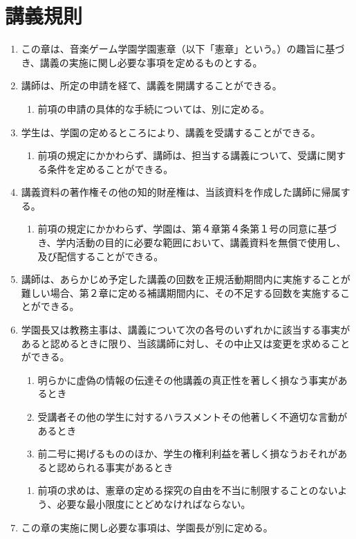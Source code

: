 \newpage
\chapter{講義規則}
\begin{enumerate}[label=第\arabic*条　]
  \item この章は、音楽ゲーム学園学園憲章（以下「憲章」という。）の趣旨に基づき、講義の実施に関し必要な事項を定めるものとする。
  \item 講師は、所定の申請を経て、講義を開講することができる。
    \begin{enumerate}[label=\arabic*　,start=2,leftmargin=*]
      \item 前項の申請の具体的な手続については、別に定める。
    \end{enumerate}
  \item 学生は、学園の定めるところにより、講義を受講することができる。
    \begin{enumerate}[label=\arabic*　,start=2,leftmargin=*]
      \item 前項の規定にかかわらず、講師は、担当する講義について、受講に関する条件を定めることができる。
    \end{enumerate}
  \item 講義資料の著作権その他の知的財産権は、当該資料を作成した講師に帰属する。
    \begin{enumerate}[label=\arabic*　,start=2,leftmargin=*]
      \item 前項の規定にかかわらず、学園は、第４章第４条第１号の同意に基づき、学内活動の目的に必要な範囲において、講義資料を無償で使用し、及び配信することができる。
    \end{enumerate}
  \item 講師は、あらかじめ予定した講義の回数を正規活動期間内に実施することが難しい場合、第２章に定める補講期間内に、その不足する回数を実施することができる。
  \item 学園長又は教務主事は、講義について次の各号のいずれかに該当する事実があると認めるときに限り、当該講師に対し、その中止又は変更を求めることができる。
      \begin{enumerate}[label=(\arabic*)　]
        \item 明らかに虚偽の情報の伝達その他講義の真正性を著しく損なう事実があるとき
        \item 受講者その他の学生に対するハラスメントその他著しく不適切な言動があるとき
        \item 前二号に掲げるもののほか、学生の権利利益を著しく損なうおそれがあると認められる事実があるとき
      \end{enumerate}
    \begin{enumerate}[label=\arabic*　,start=2,leftmargin=*]
      \item 前項の求めは、憲章の定める探究の自由を不当に制限することのないよう、必要な最小限度にとどめなければならない。
    \end{enumerate}
  \item この章の実施に関し必要な事項は、学園長が別に定める。
\end{enumerate}
